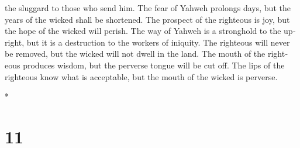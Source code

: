 \begin{paracol}{2}
\begin{otherlanguage}{english}
the sluggard to those who send him.  The fear of Yahweh
prolongs days, but the years of the wicked shall be shortened.
 The prospect of the righteous is joy, but the hope of
the wicked will perish.  The way of Yahweh is a
stronghold to the upright, but it is a destruction to the workers of
iniquity.  The righteous will never be removed, but the
wicked will not dwell in the land.  The mouth of the
righteous produces wisdom, but the perverse tongue will be cut off.
 The lips of the righteous know what is acceptable, but
the mouth of the wicked is perverse.

\end{otherlanguage}

\switchcolumn[0]*

\hypertarget{section-20}{%
\section{11}\label{section-20}}


\end{paracol}
